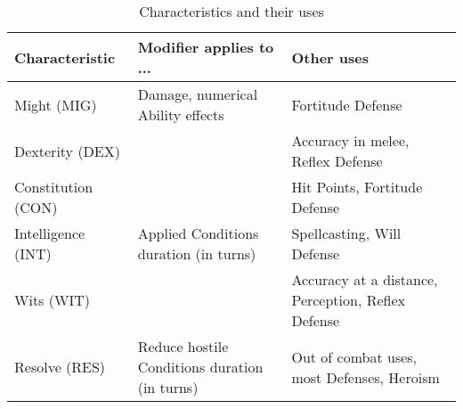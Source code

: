 \begin{table*}[h!tbp]
	\begin{center}
		\begin{tabular}{p{4cm}p{4cm}p{6cm}} \toprule
			
		    \textbf{Characteristic} & \textbf{Modifier applies to ...} & \textbf{Other uses} \\ \midrule
		    
		    Might (MIG) & Damage, numerical Ability effects & Fortitude Defense \\[2mm]
		    Dexterity (DEX) & & Accuracy in melee, Reflex Defense \\[2mm]
		    Constitution (CON) & & Hit Points, Fortitude Defense \\[2mm]
		    Intelligence (INT) & Applied Conditions duration (in turns) & Spellcasting, Will Defense \\[2mm]
		    Wits (WIT) &  & Accuracy at a distance, Perception, Reflex Defense \\[2mm]
		    Resolve (RES) & Reduce hostile Conditions duration (in turns) & Out of combat uses, most Defenses, Heroism\\[2mm]

		    \bottomrule
		\end{tabular}
	\end{center}
	\caption{Characteristics and their uses}
	\label{characteristics_table}
\end{table*}






